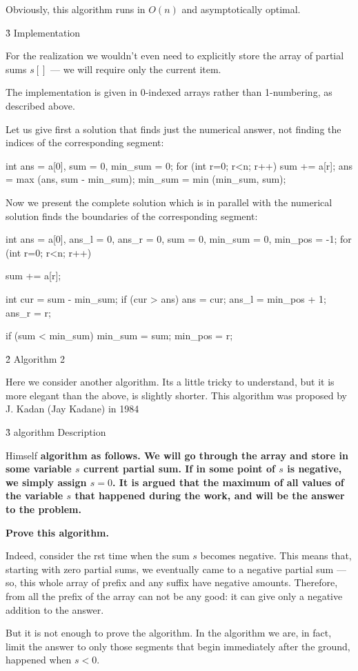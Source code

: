 Obviously, this algorithm runs in $O(n)$ and asymptotically optimal.

\h3{ Implementation }

For the realization we wouldn't even need to explicitly store the array of partial sums $s[]$ --- we will require only the current item.

The implementation is given in 0-indexed arrays rather than 1-numbering, as described above.

Let us give first a solution that finds just the numerical answer, not finding the indices of the corresponding segment:

\code
int ans = a[0],
sum = 0,
min_sum = 0;
for (int r=0; r<n; r++) {
sum += a[r];
ans = max (ans, sum - min_sum);
min_sum = min (min_sum, sum);
}
\endcode

Now we present the complete solution which is in parallel with the numerical solution finds the boundaries of the corresponding segment:

\code
int ans = a[0],
ans_l = 0,
ans_r = 0,
sum = 0,
min_sum = 0,
min_pos = -1;
for (int r=0; r<n; r++) {
sum += a[r];

int cur = sum - min_sum;
if (cur > ans) {
ans = cur;
ans_l = min_pos + 1;
ans_r = r;
}

if (sum < min_sum) {
min_sum = sum;
min_pos = r;
}
}
\endcode


\h2{ Algorithm 2 }

Here we consider another algorithm. Its a little tricky to understand, but it is more elegant than the above, is slightly shorter. This algorithm was proposed by J. Kadan (Jay Kadane) in 1984

\h3{ algorithm Description }

Himself \bf{algorithm} as follows. We will go through the array and store in some variable $s$ current partial sum. If in some point of $s$ is negative, we simply assign $s=0$. It is argued that the maximum of all values of the variable $s$ that happened during the work, and will be the answer to the problem.

\bf{Prove} this algorithm.

Indeed, consider the rst time when the sum $s$ becomes negative. This means that, starting with zero partial sums, we eventually came to a negative partial sum --- so, this whole array of prefix and any suffix have negative amounts. Therefore, from all the prefix of the array can not be any good: it can give only a negative addition to the answer.

But it is not enough to prove the algorithm. In the algorithm we are, in fact, limit the answer to only those segments that begin immediately after the ground, happened when $s<0$.

